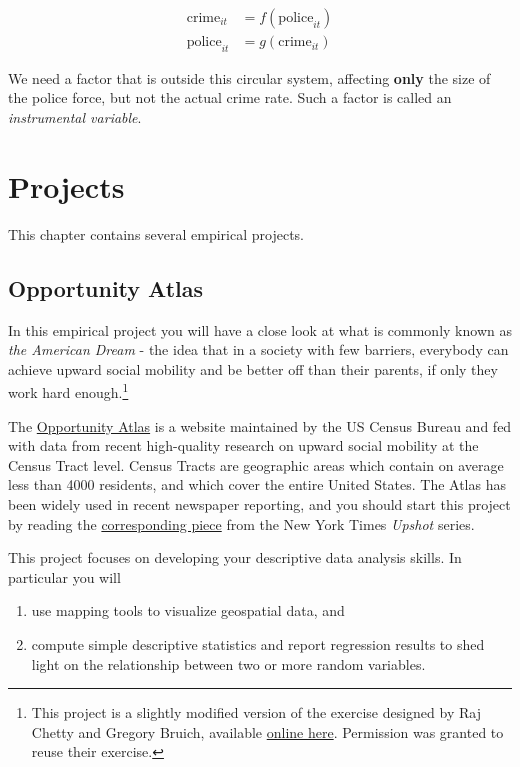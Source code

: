 \documentclass[]{book}
\providecommand{\tightlist}{%
  \setlength{\itemsep}{0pt}\setlength{\parskip}{0pt}}
\let\rmarkdownfootnote\footnote%
\def\footnote{\protect\rmarkdownfootnote}
\begin{document}
\begin{align*}
\text{crime}_{it} &= f(\text{police}_{it}) \\
\text{police}_{it}&= g(\text{crime}_{it} )
\end{align*}

We need a factor that is outside this circular system, affecting
\textbf{only} the size of the police force, but not the actual crime
rate. Such a factor is called an \emph{instrumental variable}.

\chapter{Projects}\label{projects}

This chapter contains several empirical projects.

\section{Opportunity Atlas}\label{opp-atlas}

In this empirical project you will have a close look at what is commonly
known as \emph{the American Dream} - the idea that in a society with few
barriers, everybody can achieve upward social mobility and be better off
than their parents, if only they work hard enough.\footnote{This project
  is a slightly modified version of the exercise designed by Raj Chetty
  and Gregory Bruich, available
  \href{https://opportunityinsights.org/course/}{online here}.
  Permission was granted to reuse their exercise.}

The \href{https://www.opportunityatlas.org}{Opportunity Atlas} is a
website maintained by the US Census Bureau and fed with data from recent
high-quality research on upward social mobility at the Census Tract
level. Census Tracts are geographic areas which contain on average less
than 4000 residents, and which cover the entire United States. The Atlas
has been widely used in recent newspaper reporting, and you should start
this project by reading the
\href{https://www.nytimes.com/2018/10/01/upshot/maps-neighborhoods-shape-child-poverty.html}{corresponding
piece} from the New York Times \emph{Upshot} series.

This project focuses on developing your descriptive data analysis
skills. In particular you will

\begin{enumerate}
\def\labelenumi{\arabic{enumi}.}
\tightlist
\item
  use mapping tools to visualize geospatial data, and
\item
  compute simple descriptive statistics and report regression results to
  shed light on the relationship between two or more random variables.
\end{enumerate}
\end{document}
